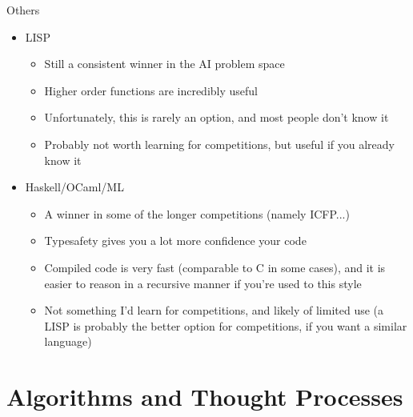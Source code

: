 \documentclass{beamer}
\begin{document}
\begin{frame}{Others}
  \begin{centering}
    \begin{itemize}
      \item LISP
      \begin{itemize}
        \item Still a consistent winner in the AI problem space
        \item Higher order functions are incredibly useful
        \item Unfortunately, this is rarely an option, and most people don't know it
        \item Probably not worth learning for competitions, but useful if you already know it
      \end{itemize}
      \item Haskell/OCaml/ML
      \begin{itemize}
        \item A winner in some of the longer competitions (namely ICFP...)
        \item Typesafety gives you a lot more confidence your code
        \item Compiled code is very fast (comparable to C in some cases), and it is easier to reason in a recursive manner if you're used to this style
        \item Not something I'd learn for competitions, and likely of limited use (a LISP is probably the better option for competitions, if you want a similar language)
      \end{itemize}
    \end{itemize}
  \end{centering}
\end{frame}


\section{Algorithms and Thought Processes}
\end{document}
